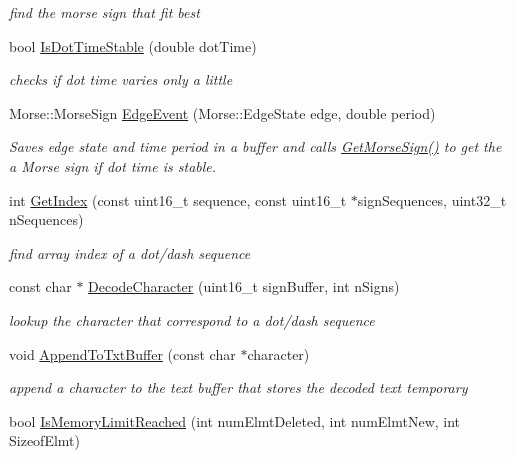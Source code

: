 \begin{DoxyCompactItemize}
\begin{DoxyCompactList}\small\item\em find the morse sign that fit best \end{DoxyCompactList}\item 
bool \hyperlink{classMorseDecode_af3dc30a7ec25c0eaba9c3e4c08029939}{Is\+Dot\+Time\+Stable} (double dot\+Time)
\begin{DoxyCompactList}\small\item\em checks if dot time varies only a little \end{DoxyCompactList}\item 
Morse\+::\+Morse\+Sign \hyperlink{classMorseDecode_ad02e7621b4c4e8a5b766dc4f4f31fa05}{Edge\+Event} (Morse\+::\+Edge\+State edge, double period)
\begin{DoxyCompactList}\small\item\em Saves edge state and time period in a buffer and calls \hyperlink{classMorseDecode_aff88997ef0a7621027bab01be18473a0}{Get\+Morse\+Sign()} to get the a Morse sign if dot time is stable. \end{DoxyCompactList}\item 
int \hyperlink{classMorseDecode_a36af09ea953ef87950f654fcf0179294}{Get\+Index} (const uint16\+\_\+t sequence, const uint16\+\_\+t $\ast$sign\+Sequences, uint32\+\_\+t n\+Sequences)
\begin{DoxyCompactList}\small\item\em find array index of a dot/dash sequence \end{DoxyCompactList}\item 
const char $\ast$ \hyperlink{classMorseDecode_a3ff969902811aa7eefbccb027d0cbcda}{Decode\+Character} (uint16\+\_\+t sign\+Buffer, int n\+Signs)
\begin{DoxyCompactList}\small\item\em lookup the character that correspond to a dot/dash sequence \end{DoxyCompactList}\item 
void \hyperlink{classMorseDecode_a9e189d9682a7291f7fc86eb6b86d817d}{Append\+To\+Txt\+Buffer} (const char $\ast$character)
\begin{DoxyCompactList}\small\item\em append a character to the text buffer that stores the decoded text temporary \end{DoxyCompactList}\item 
bool \hyperlink{classMorseDecode_a3d3db86f34bbc8524b3b26e439bcb219}{Is\+Memory\+Limit\+Reached} (int num\+Elmt\+Deleted, int num\+Elmt\+New, int Sizeof\+Elmt)

\end{DoxyCompactItemize}
